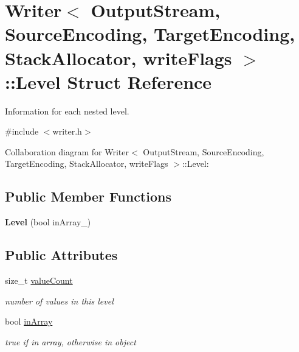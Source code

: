 \hypertarget{struct_writer_1_1_level}{}\section{Writer$<$ Output\+Stream, Source\+Encoding, Target\+Encoding, Stack\+Allocator, write\+Flags $>$\+:\+:Level Struct Reference}
\label{struct_writer_1_1_level}


Information for each nested level.  




{\ttfamily \#include $<$writer.\+h$>$}



Collaboration diagram for Writer$<$ Output\+Stream, Source\+Encoding, Target\+Encoding, Stack\+Allocator, write\+Flags $>$\+:\+:Level\+:
\subsection*{Public Member Functions}
\begin{DoxyCompactItemize}
\item 
\mbox{\label{struct_writer_1_1_level_a0b1844a7a1b7c6c20e1964dbb67da484}} 
{\bfseries Level} (bool in\+Array\+\_\+)
\end{DoxyCompactItemize}
\subsection*{Public Attributes}
\begin{DoxyCompactItemize}
\item 
\mbox{\label{struct_writer_1_1_level_a4a09e5fda49d0d57b2adc041203f244f}} 
size\+\_\+t \hyperlink{struct_writer_1_1_level_a4a09e5fda49d0d57b2adc041203f244f}{value\+Count}
\begin{DoxyCompactList}\small\item\em number of values in this level \end{DoxyCompactList}\item 
\mbox{\label{struct_writer_1_1_level_aa009a2d675e98757c2997072aad78789}} 
bool \hyperlink{struct_writer_1_1_level_aa009a2d675e98757c2997072aad78789}{in\+Array}
\begin{DoxyCompactList}\small\item\em true if in array, otherwise in object \end{DoxyCompactList}\end{DoxyCompactItemize}


